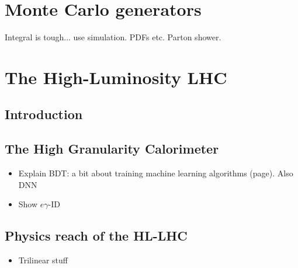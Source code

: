 \section{Monte Carlo generators}\label{sec:mc}
Integral is tough... use simulation. PDFs etc. Parton shower.

\section{The High-Luminosity LHC}
\subsection{Introduction}

\subsection{The High Granularity Calorimeter}
\begin{itemize}
    \item Explain BDT: a bit about training machine learning algorithms (page). Also DNN
    \item Show $e\gamma$-ID 
\end{itemize}

\subsection{Physics reach of the HL-LHC}
\begin{itemize}
    \item Trilinear stuff
\end{itemize}